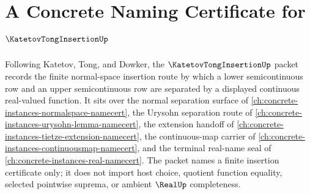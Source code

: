 \chapter{A Concrete Naming Certificate for $\KatetovTongInsertionUp$}
\label{ch:concrete-instances-katetov-tong-insertion-namecert}

Following Katetov, Tong, and Dowker, the $\KatetovTongInsertionUp$ packet records the finite normal-space insertion route by which a lower semicontinuous row and an upper semicontinuous row are separated by a displayed continuous real-valued function. It sits over the normal separation surface of \autoref{ch:concrete-instances-normalspace-namecert}, the Urysohn separation route of \autoref{ch:concrete-instances-urysohn-lemma-namecert}, the extension handoff of \autoref{ch:concrete-instances-tietze-extension-namecert}, the continuous-map carrier of \autoref{ch:concrete-instances-continuousmap-namecert}, and the terminal real-name seal of \autoref{ch:concrete-instances-real-namecert}. The packet names a finite insertion certificate only; it does not import host choice, quotient function equality, selected pointwise suprema, or ambient $\RealUp$ completeness.

